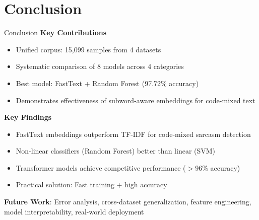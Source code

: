 \documentclass[aspectratio=169,xcolor=dvipsnames]{beamer}
\begin{document}

\section{Conclusion}

\begin{frame}{Conclusion}
    \textbf{Key Contributions}
    \begin{itemize}
        \item Unified corpus: 15,099 samples from 4 datasets
        \item Systematic comparison of 8 models across 4 categories
        \item Best model: FastText + Random Forest (97.72\% accuracy)
        \item Demonstrates effectiveness of subword-aware embeddings for code-mixed text
    \end{itemize}
    
    \vspace{0.3cm}
    
    \textbf{Key Findings}
    \begin{itemize}
        \item FastText embeddings outperform TF-IDF for code-mixed sarcasm detection
        \item Non-linear classifiers (Random Forest) better than linear (SVM)
        \item Transformer models achieve competitive performance ($>$96\% accuracy)
        \item Practical solution: Fast training + high accuracy
    \end{itemize}
    
    \vspace{0.3cm}
    
    \textbf{Future Work}: Error analysis, cross-dataset generalization, feature engineering, model interpretability, real-world deployment
\end{frame}
\end{document}

